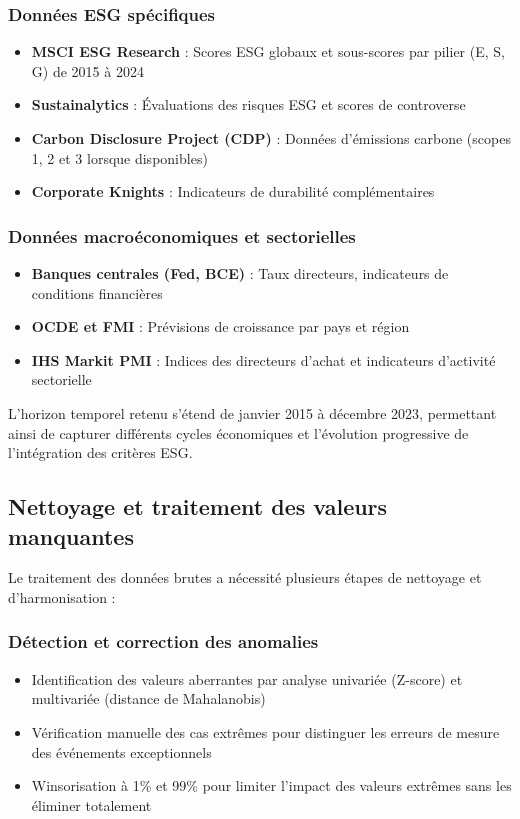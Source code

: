 \subsubsection{Données ESG spécifiques}
\begin{itemize}
  \item \textbf{MSCI ESG Research} : Scores ESG globaux et sous-scores par pilier (E, S, G) de 2015 à 2024
  \item \textbf{Sustainalytics} : Évaluations des risques ESG et scores de controverse
  \item \textbf{Carbon Disclosure Project (CDP)} : Données d'émissions carbone (scopes 1, 2 et 3 lorsque disponibles)
  \item \textbf{Corporate Knights} : Indicateurs de durabilité complémentaires
\end{itemize}

\subsubsection{Données macroéconomiques et sectorielles}
\begin{itemize}
  \item \textbf{Banques centrales (Fed, BCE)} : Taux directeurs, indicateurs de conditions financières
  \item \textbf{OCDE et FMI} : Prévisions de croissance par pays et région
  \item \textbf{IHS Markit PMI} : Indices des directeurs d'achat et indicateurs d'activité sectorielle
\end{itemize}

L'horizon temporel retenu s'étend de janvier 2015 à décembre 2023, permettant ainsi de capturer différents cycles économiques et l'évolution progressive de l'intégration des critères ESG.

\subsection{Nettoyage et traitement des valeurs manquantes}

Le traitement des données brutes a nécessité plusieurs étapes de nettoyage et d'harmonisation :

\subsubsection{Détection et correction des anomalies}
\begin{itemize}
  \item Identification des valeurs aberrantes par analyse univariée (Z-score) et multivariée (distance de Mahalanobis)
  \item Vérification manuelle des cas extrêmes pour distinguer les erreurs de mesure des événements exceptionnels
  \item Winsorisation à 1\% et 99\% pour limiter l'impact des valeurs extrêmes sans les éliminer totalement
\end{itemize}

